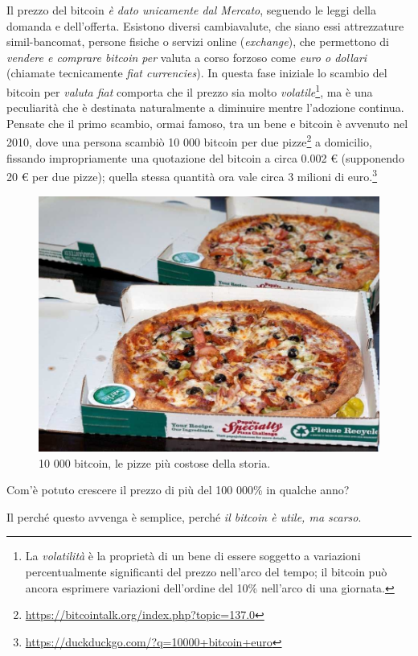 \documentclass[a4paper,12pt,italian]{article}
\begin{document}
\smallskip

Il prezzo del bitcoin \emph{è dato unicamente dal Mercato}, seguendo le leggi della domanda e
dell'offerta. Esistono diversi cambiavalute, che siano essi attrezzature simil-bancomat,
persone fisiche o servizi online (\emph{exchange}), che permettono di \emph{vendere e comprare bitcoin per} valuta a
corso forzoso come \emph{euro o dollari} (chiamate tecnicamente \emph{fiat currencies}).
In questa fase iniziale lo scambio del bitcoin per \emph{valuta fiat} comporta
che il prezzo sia molto \emph{volatile}\footnote{
La \emph{volatilità} è la proprietà di un bene di essere soggetto a variazioni
percentualmente significanti del prezzo nell'arco del tempo; il bitcoin può ancora 
esprimere variazioni dell'ordine del 10\% nell'arco di una giornata.},
ma è una peculiarità che è destinata
naturalmente a diminuire mentre l’adozione continua. Pensate che il
primo scambio, ormai famoso, tra un bene e bitcoin è avvenuto nel 2010, dove una
persona scambiò 10 000 bitcoin per due pizze\footnote{\url{https://bitcointalk.org/index.php?topic=137.0}}
a domicilio, fissando
impropriamente una quotazione del bitcoin a circa 0.002 € (supponendo
20 € per due pizze); quella stessa quantità ora vale circa 3 milioni di
euro.\footnote{\url{https://duckduckgo.com/?q=10000+bitcoin+euro}}

\begin{figure}
\centering
\includegraphics[width=.8\linewidth]{figures/laszlo_pizzas.jpg}
\caption{10 000 bitcoin, le pizze più costose della storia.}
\end{figure}


Com’è potuto crescere il prezzo di più del 100 000\% in qualche
anno?

\bigskip


Il perché questo avvenga è semplice, perché \emph{il bitcoin è utile, ma
scarso}.
\bigskip
\end{document}
